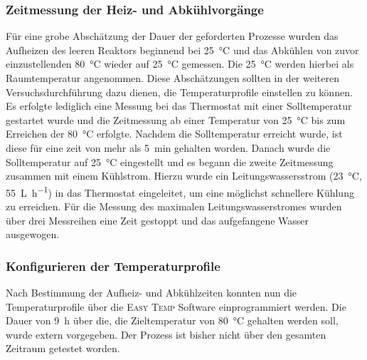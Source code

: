 \subsubsection*{Zeitmessung der Heiz- und Abkühlvorgänge}
Für eine grobe Abschätzung der Dauer der geforderten Prozesse wurden das Aufheizen des leeren Reaktors beginnend bei \SI{25}{\celsius} und das Abkühlen von zuvor einzustellenden \SI{80}{\celsius} wieder auf \SI{25}{\celsius} gemessen. Die \SI{25}{\celsius} werden hierbei als Raumtemperatur angenommen. Diese Abschätzungen sollten in der weiteren Versuchsdurchführung dazu dienen, die Temperaturprofile einstellen zu können.\\
Es erfolgte lediglich eine Messung bei das Thermostat mit einer Solltemperatur gestartet wurde und die Zeitmessung ab einer Temperatur von \SI{25}{\celsius} bis zum Erreichen der \SI{80}{\celsius} erfolgte. Nachdem die Solltemperatur erreicht wurde, ist diese für eine zeit von mehr als \SI{5}{\minute} gehalten worden. Danach wurde die Solltemperatur auf \SI{25}{\celsius} eingestellt und es begann die zweite Zeitmessung zusammen mit einem Kühlstrom. Hierzu wurde ein Leitungswassersstrom (\SI{23}{\celsius}, \SI{55}{\liter\per \hour}) in das Thermostat eingeleitet, um eine möglichst schnellere Kühlung zu erreichen. Für die Messung des maximalen Leitungswasserstromes wurden über drei Messreihen eine Zeit gestoppt und das aufgefangene Wasser ausgewogen.

\subsubsection*{Konfigurieren der Temperaturprofile}
Nach Bestimmung der Aufheiz- und Abkühlzeiten konnten nun die Temperaturprofile über die \textsc{Easy Temp} Software einprogrammiert werden. Die Dauer von \SI{9}{\hour} über die, die Zieltemperatur von \SI{80}{\celsius} gehalten werden soll, wurde extern vorgegeben. Der Prozess ist bisher nicht über den gesamten Zeitraum getestet worden.

%

